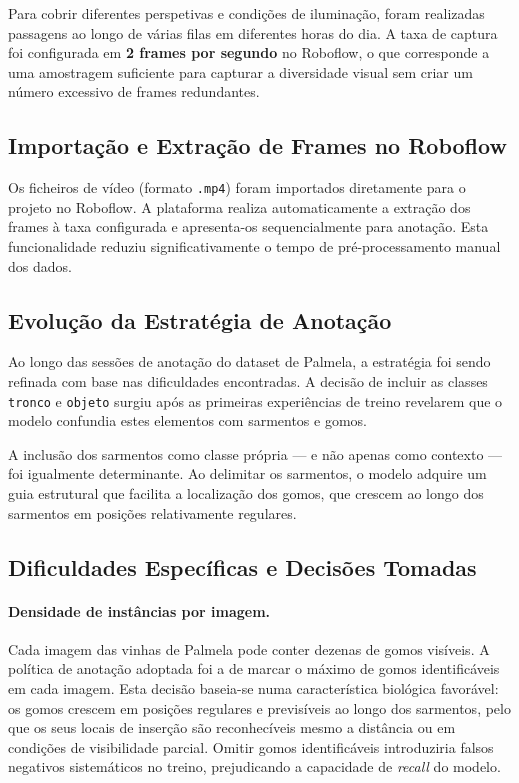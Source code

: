 Para cobrir diferentes perspetivas e condições de iluminação, foram
realizadas passagens ao longo de várias filas em diferentes horas do dia.
A taxa de captura foi configurada em \textbf{2 frames por segundo} no
Roboflow, o que corresponde a uma amostragem suficiente para capturar a
diversidade visual sem criar um número excessivo de frames redundantes.

\subsection{Importação e Extração de Frames no Roboflow}

Os ficheiros de vídeo (formato \texttt{.mp4}) foram importados diretamente
para o projeto no Roboflow. A plataforma realiza automaticamente a extração
dos frames à taxa configurada e apresenta-os sequencialmente para anotação.
Esta funcionalidade reduziu significativamente o tempo de pré-processamento
manual dos dados.

\subsection{Evolução da Estratégia de Anotação}

Ao longo das sessões de anotação do dataset de Palmela, a estratégia foi
sendo refinada com base nas dificuldades encontradas. A decisão de incluir
as classes \texttt{tronco} e \texttt{objeto} surgiu após as primeiras experiências
de treino revelarem que o modelo confundia estes elementos com sarmentos e
gomos.

A inclusão dos sarmentos como classe própria — e não apenas como
contexto — foi igualmente determinante. Ao delimitar os sarmentos, o modelo
adquire um guia estrutural que facilita a localização dos gomos, que crescem
ao longo dos sarmentos em posições relativamente regulares.

\subsection{Dificuldades Específicas e Decisões Tomadas}

\paragraph{Densidade de instâncias por imagem.}
Cada imagem das vinhas de Palmela pode conter dezenas de gomos visíveis.
A política de anotação adoptada foi a de marcar o máximo de gomos
identificáveis em cada imagem. Esta decisão baseia-se numa característica
biológica favorável: os gomos crescem em posições regulares e previsíveis ao
longo dos sarmentos, pelo que os seus locais de inserção são reconhecíveis
mesmo a distância ou em condições de visibilidade parcial. Omitir gomos
identificáveis introduziria falsos negativos sistemáticos no treino,
prejudicando a capacidade de \textit{recall} do modelo.

